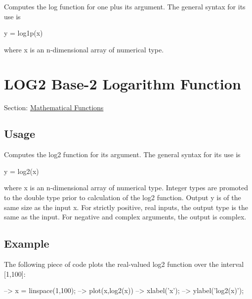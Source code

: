 Computes the {\ttfamily log} function for one plus its argument. The general syntax for its use is \begin{DoxyVerb}  y = log1p(x)
\end{DoxyVerb}
 where {\ttfamily x} is an {\ttfamily n}-\/dimensional array of numerical type. \hypertarget{mathfunctions_log2}{}\section{L\-O\-G2 Base-\/2 Logarithm Function}\label{mathfunctions_log2}
Section\-: \hyperlink{sec_mathfunctions}{Mathematical Functions} \hypertarget{vtkwidgets_vtkxyplotwidget_Usage}{}\subsection{Usage}\label{vtkwidgets_vtkxyplotwidget_Usage}
Computes the {\ttfamily log2} function for its argument. The general syntax for its use is \begin{DoxyVerb}  y = log2(x)
\end{DoxyVerb}
 where {\ttfamily x} is an {\ttfamily n}-\/dimensional array of numerical type. Integer types are promoted to the {\ttfamily double} type prior to calculation of the {\ttfamily log2} function. Output {\ttfamily y} is of the same size as the input {\ttfamily x}. For strictly positive, real inputs, the output type is the same as the input. For negative and complex arguments, the output is complex. \hypertarget{variables_struct_Example}{}\subsection{Example}\label{variables_struct_Example}
The following piece of code plots the real-\/valued {\ttfamily log2} function over the interval {\ttfamily \mbox{[}1,100\mbox{]}}\-:


\begin{DoxyVerbInclude}
--> x = linspace(1,100);
--> plot(x,log2(x))
--> xlabel('x');
--> ylabel('log2(x)');
\end{DoxyVerbInclude}



